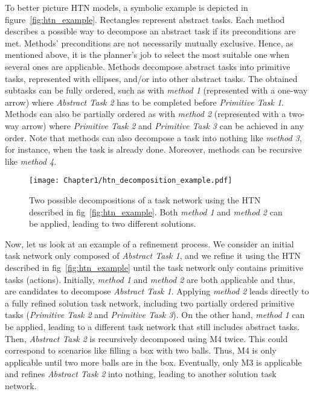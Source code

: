 To better picture HTN models, a symbolic example is depicted in figure~\ref{fig:htn_example}.
Rectangles represent abstract tasks. Each method describes a possible way to decompose an abstract task if its preconditions are met. Methods' preconditions are not necessarily mutually exclusive. Hence, as mentioned above, it is the planner's job to select the most suitable one when several ones are applicable.
Methods decompose abstract tasks into primitive tasks, represented with ellipses, and/or into other abstract tasks. The obtained subtasks can be fully ordered, such as with \emph{method 1} (represented with a one-way arrow) where \emph{Abstract Task 2} has to be completed before \emph{Primitive Task 1}. Methods can also be partially ordered as with \emph{method 2} (represented with a two-way arrow) where \emph{Primitive Task 2} and \emph{Primitive Task 3} can be achieved in any order. Note that methods can also decompose a task into nothing like \emph{method 3}, for instance, when the task is already done. Moreover, methods can be recursive like \emph{method 4}.

\begin{figure}
    \center
    \texttt{[image: Chapter1/htn\_decomposition\_example.pdf]}
    \caption{Two possible decompositions of a task network using the HTN described in fig~\ref{fig:htn_example}. Both \emph{method 1} and \emph{method 2} can be applied, leading to two different solutions.
    }
    \label{fig:htn_decomposition_example}
\end{figure}

Now, let us look at an example of a refinement process. We consider an initial task network only composed of \emph{Abstract Task 1}, and we refine it using the HTN described in fig~\ref{fig:htn_example} until the task network only contains primitive tasks (actions). Initially, \emph{method 1} and \emph{method 2} are both applicable and thus, are candidates to decompose \emph{Abstract Task 1}. Applying \emph{method 2} leads directly to a fully refined solution task network, including two partially ordered primitive tasks (\emph{Primitive Task 2} and \emph{Primitive Task 3}). On the other hand, \emph{method 1} can be applied, leading to a different task network that still includes abstract tasks. Then, \emph{Abstract Task 2} is recursively decomposed using M4 twice. This could correspond to scenarios like filling a box with two balls. Thus, M4 is only applicable until two more balls are in the box. Eventually, only M3 is applicable and refines \emph{Abstract Task 2} into nothing, leading to another solution task network.

